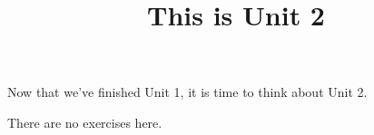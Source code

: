 \documentclass{ximera}
\title{This is Unit 2}
\begin{document}
Now that we've finished Unit 1, it is time to think about Unit 2.


There are no exercises here.
\end{document}
